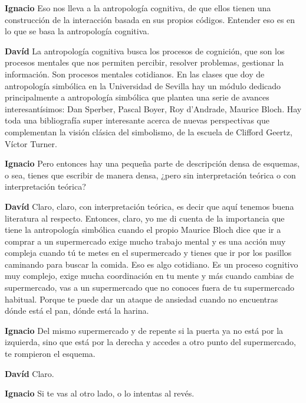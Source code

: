 \documentclass[
  spanish,
  11pt,
  a4paper,
]{scrbook}
\newenvironment{transcripcion}{
    \begin{list}{}{
        \setlength{\leftmargin}{1.5em}  %
        \setlength{\rightmargin}{0em}
        \setlength{\itemsep}{0.2em}     %
        \setlength{\parsep}{0.0em}
        \setlength{\listparindent}{0pt}
    }
}{
    \end{list}
}
\newcommand{\personaje}[1]{\textbf{#1}\quad}
\begin{document}
\begin{transcripcion}
\item \personaje{Ignacio} Eso nos lleva a la antropología cognitiva, de que ellos tienen una construcción de la interacción basada en sus propios códigos. Entender eso es en lo que se basa la antropología cognitiva.

\item \personaje{Davíd} La antropología cognitiva busca los procesos de cognición, que son los procesos mentales que nos permiten percibir, resolver problemas, gestionar la información. Son procesos mentales cotidianos. En las clases que doy de antropología simbólica en la Universidad de Sevilla hay un módulo dedicado principalmente a antropología simbólica que plantea una serie de avances interesantísimos: Dan Sperber, Pascal Boyer, Roy d'Andrade, Maurice Bloch. Hay toda una bibliografía super interesante acerca de nuevas perspectivas que complementan la visión clásica del simbolismo, de la escuela de Clifford Geertz, Víctor Turner.

\item \personaje{Ignacio} Pero entonces hay una pequeña parte de descripción densa de esquemas, o sea, tienes que escribir de manera densa, ¿pero sin interpretación teórica o con interpretación teórica?

\item \personaje{Davíd} Claro, claro, con interpretación teórica, es decir que aquí tenemos buena literatura al respecto. Entonces, claro, yo me di cuenta de la importancia que tiene la antropología simbólica cuando el propio Maurice Bloch dice que ir a comprar a un supermercado exige mucho trabajo mental y es una acción muy compleja cuando tú te metes en el supermercado y tienes que ir por los pasillos caminando para buscar la comida. Eso es algo cotidiano. Es un proceso cognitivo muy complejo, exige mucha coordinación en tu mente y más cuando cambias de supermercado, vas a un supermercado que no conoces fuera de tu supermercado habitual. Porque te puede dar un ataque de ansiedad cuando no encuentras dónde está el pan, dónde está la harina.

\item \personaje{Ignacio} Del mismo supermercado y de repente si la puerta ya no está por la izquierda, sino que está por la derecha y accedes a otro punto del supermercado, te rompieron el esquema.

\item \personaje{Davíd} Claro.

\item \personaje{Ignacio} Si te vas al otro lado, o lo intentas al revés.


\end{transcripcion}
\end{document}
